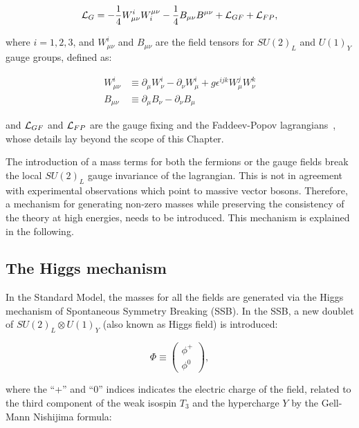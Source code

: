 \begin{equation}
\mathcal{L}_{G} = -\frac{1}{4}W_{\mu\nu}^i W^{\mu\nu}_i - \frac{1}{4}B_{\mu\nu}B^{\mu\nu} + \mathcal{L}_{GF} + \mathcal{L}_{FP},
\label{eq:EWKLagrangianGauge}
\end{equation}

\noindent where $i=1, 2, 3$, and $W_{\mu\nu}^i$ and $B_{\mu\nu}$ are the field tensors for $SU(2)_L$ and $U(1)_Y$ gauge groups, defined as:

\begin{equation}
\begin{split}
W_{\mu\nu}^i & \equiv \partial_\mu W_\nu^i - \partial_\nu W_\mu^i + g\epsilon^{ijk} W_\mu^j W_\nu^k \\
B_{\mu\nu} & \equiv \partial_\mu B_\nu - \partial_\nu B_\mu
\end{split}
\label{EWKFieldTensors}
\end{equation}

\noindent and $\mathcal{L}_{GF}$ and $\mathcal{L}_{FP}$ are the gauge fixing and the Faddeev-Popov lagrangians~\cite{Peskin:1995ev}, whose details lay beyond the scope of this Chapter.

The introduction of a mass terms for both the fermions or the gauge fields break the local $SU(2)_L$ gauge invariance of the lagrangian.
This is not in agreement with experimental observations which point to massive vector bosons.
Therefore, a mechanism for generating non-zero masses while preserving the consistency of the theory at high energies, needs to be introduced.
This mechanism is explained in the following.

\subsection{The Higgs mechanism}
    \label{sec:HiggsMechanism}

In the Standard Model, the masses for all the fields are generated via the Higgs mechanism of Spontaneous Symmetry Breaking (SSB).
In the SSB, a new doublet of $SU(2)_L \otimes U(1)_Y$ (also known as Higgs field) is introduced:

\begin{equation}
\Phi \equiv \left(
    \begin{matrix}
    \phi^{+} \\
    \phi^{0}
    \end{matrix}
    \right),
\label{eq:HiggsFieldRaw}
\end{equation}

\noindent where the ``+'' and ``0'' indices indicates the electric charge of the field, related to the third component of the weak isospin $T_3$ and the hypercharge $Y$ by the Gell-Mann Nishijima formula:

